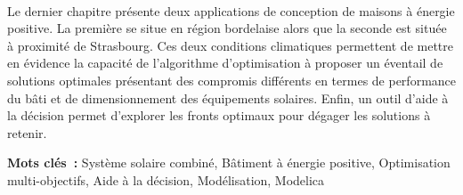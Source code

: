 \paragraph{} %
Le dernier chapitre présente deux applications de conception de maisons à énergie
positive. La première se situe en région bordelaise alors que la seconde est située à
proximité de Strasbourg. Ces deux conditions climatiques permettent de mettre en évidence
la capacité de l’algorithme d’optimisation à proposer un éventail de solutions optimales
présentant des compromis différents en termes de performance du bâti et de dimensionnement
des équipements solaires. Enfin, un outil d’aide à la décision permet d’explorer les
fronts optimaux pour dégager les solutions à retenir.

\vfill
\noindent\textbf{Mots clés~:} Système solaire combiné, Bâtiment à énergie positive, Optimisation multi-objectifs, Aide à la décision, Modélisation, Modelica
